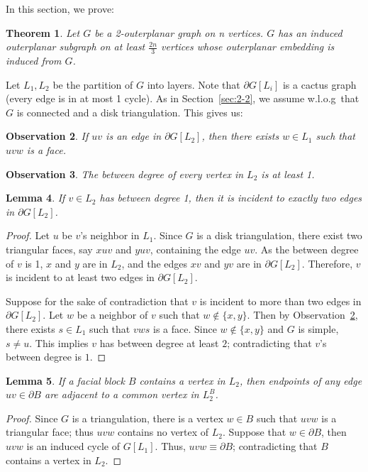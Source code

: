 \documentclass[11pt]{article}
\newtheorem{theorem}{Theorem}
\newtheorem{lemma}[theorem]{Lemma}
\newtheorem{observation}[theorem]{Observation}
\begin{document}
In this section, we prove:
\begin{theorem} \label{thm:2outer}
Let $G$ be a 2-outerplanar graph on n vertices. $G$ has an induced outerplanar subgraph on at least $\frac{2n}{3}$ vertices whose outerplanar embedding is induced from $G$.
\end{theorem}

Let $L_1,L_2$ be the partition of $G$ into layers.  Note that $\partial G[L_i]$ is a cactus graph (every edge is in at most 1 cycle). As in Section~\ref{sec:2-2}, we assume w.l.o.g\ that $G$ is connected and a disk triangulation. This gives us:

\begin{observation} \label{obs:face-uvw}
If $uv$ is an edge in $\partial G[L_2]$, then there exists $w\in L_1$ such that $uvw$ is a face.
\end{observation}

\begin{observation} \label{obs:between-deg-at-least-1}
The between degree of every vertex in $L_2$ is at least 1. 
\end{observation}

\begin{lemma} \label{lm:twoext}
If $v\in L_2$ has between degree 1, then it is incident to exactly two edges in $\partial G[L_2]$.
\end{lemma}

\begin{proof}
Let $u$ be $v$'s neighbor in $L_1$. Since $G$ is a disk triangulation, there exist two triangular faces, say $xuv$ and $yuv$, containing the edge $uv$. As the between degree of $v$ is 1, $x$ and $y$ are in $L_2$, and the edges $xv$ and $yv$ are in $\partial G[L_2]$. Therefore, $v$ is incident to at least two edges in $\partial G[L_2]$. 

Suppose for the sake of contradiction that $v$ is incident to more than two edges in $\partial G[L_2]$.  Let $w$ be a neighbor of $v$ such that $w \not\in \{x,y\}$. Then by Observation~\ref{obs:face-uvw}, there exists $s\in L_1$ such that $vws$ is a face. Since $w\notin \{x, y\}$ and $G$ is simple, $s \neq u$. This implies $v$ has between degree at least $2$; contradicting that $v$'s between degree is $1$. 
\end{proof}

\begin{lemma} \label{lm:uv-edge-partial-B}
If a facial block $B$ contains a vertex in $L_2$, then endpoints of any edge $uv \in \partial B$ are adjacent to a common vertex in $L^B_2$.
\end{lemma}
\begin{proof}
Since $G$ is a triangulation, there is a vertex $w \in B$ such that $uvw$ is a triangular face; thus $uvw$ contains no vertex of $L_2$. Suppose that $w \in \partial B$, then $uvw$ is an induced cycle of $G[L_1]$. Thus, $uvw \equiv \partial B$; contradicting that $B$ contains a vertex in $L_2$.
\end{proof}
\end{document}
